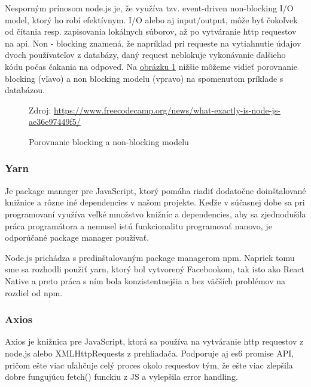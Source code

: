 Nesporným prínosom node.js je, že využíva tzv. event-driven non-blocking I/O model, ktorý ho robí efektívnym. I/O alebo aj input/output, môže byť čokoľvek od čítania resp. zapisovania lokálnych súborov, až po vytváranie \acrshort{http} requestov na \acrshort{api}. Non - blocking znamená, že napríklad pri requeste na vytiahnutie údajov dvoch používateľov z databázy, daný request neblokuje vykonávanie ďalšieho kódu počas čakania na odpoveď. Na \hyperref[nodejsImg]{ obrázku \ref{nodejsImg}} nižšie môžeme vidieť porovnanie blocking (vľavo) a non blocking modelu (vpravo) na spomenutom príklade s databázou. \cite{nodejs} \\

\begin{figure}[!htbp]
  \centering  
  \def\stackalignment{c}
           {\scriptsize%
            Zdroj: \url{https://www.freecodecamp.org/news/what-exactly-is-node-js-ae36e97449f5/}}
	\caption{Porovnanie blocking a non-blocking modelu}  
  \label{nodejsImg}
\end{figure}

\subsubsection{Yarn}
Je package manager pre JavaScript, ktorý pomáha riadiť dodatočne doinštalované knižnice a rôzne iné dependencies v našom projekte. Keďže v súčasnej dobe sa pri programovaní využíva veľké množstvo knižníc a dependencies, aby sa zjednodušila práca programátora a nemusel istú funkcionalitu programovať nanovo, je odporúčané package manager používať.

Node.js prichádza s predinštalovaným package managerom npm. Napriek tomu sme sa rozhodli použiť yarn, ktorý bol vytvorený Facebookom, tak isto ako React Native a preto práca s ním bola konzistentnejšia a bez väčších problémov na rozdiel od npm. \\

\subsubsection{Axios}
Axios je knižnica pre JavaScript, ktorá sa používa na vytváranie \acrshort{http} requestov z node.js alebo XMLHttpRequests z prehliadača. Podporuje aj \acrshort{es6} promise API, pričom ešte viac uľahčuje celý proces okolo requestov tým, že ešte viac zlepšila dobre fungujúcu fetch() funckiu z JS a vylepšila error handling. \cite{axios} \\

